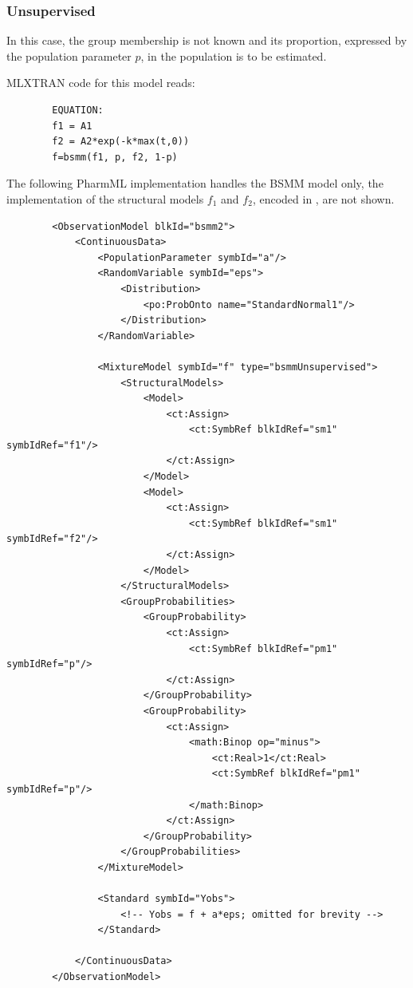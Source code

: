 \subsubsection*{Unsupervised}
In this case, the group membership is not known and its proportion, expressed
by the population parameter $p$, in the population is to be estimated. 

\bigskip
MLXTRAN code for this model reads:
\lstset{language=MLX}
\begin{lstlisting}
		EQUATION:
		f1 = A1
		f2 = A2*exp(-k*max(t,0))
		f=bsmm(f1, p, f2, 1-p)
\end{lstlisting}

The following PharmML implementation handles the BSMM model only, 
the implementation of the structural models $f_1$ and $f_2$, encoded in 
 , are not shown.

\lstset{language=XML}
\begin{lstlisting}
        <ObservationModel blkId="bsmm2">
            <ContinuousData>
                <PopulationParameter symbId="a"/>
                <RandomVariable symbId="eps">
                    <Distribution>
                        <po:ProbOnto name="StandardNormal1"/>
                    </Distribution>
                </RandomVariable>
                
                <MixtureModel symbId="f" type="bsmmUnsupervised">
                    <StructuralModels>
                        <Model>
                            <ct:Assign>
                                <ct:SymbRef blkIdRef="sm1" symbIdRef="f1"/>
                            </ct:Assign>
                        </Model>
                        <Model>
                            <ct:Assign>
                                <ct:SymbRef blkIdRef="sm1" symbIdRef="f2"/>
                            </ct:Assign>
                        </Model>
                    </StructuralModels>
                    <GroupProbabilities>
                        <GroupProbability>
                            <ct:Assign>
                                <ct:SymbRef blkIdRef="pm1" symbIdRef="p"/>
                            </ct:Assign>
                        </GroupProbability>
                        <GroupProbability>
                            <ct:Assign>
                                <math:Binop op="minus">
                                    <ct:Real>1</ct:Real>
                                    <ct:SymbRef blkIdRef="pm1" symbIdRef="p"/>
                                </math:Binop>
                            </ct:Assign>
                        </GroupProbability>
                    </GroupProbabilities>
                </MixtureModel>
                             
                <Standard symbId="Yobs">
                    <!-- Yobs = f + a*eps; omitted for brevity -->
                </Standard>
                
            </ContinuousData>
        </ObservationModel>
\end{lstlisting}


